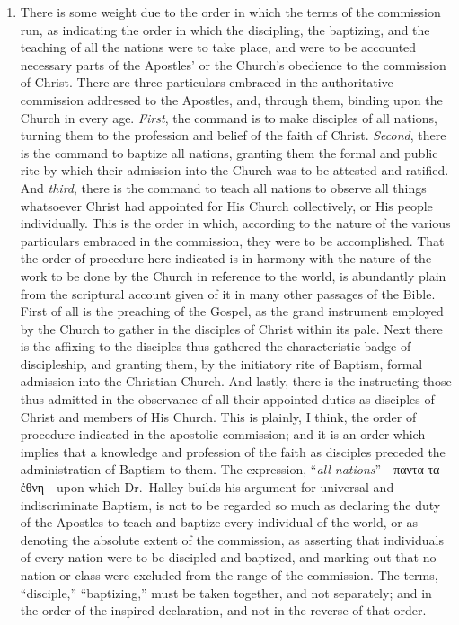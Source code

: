 \documentclass[
]{book}
\begin{document}
\begin{enumerate}
\def\labelenumi{\arabic{enumi}.}
\item
  There is some weight due to the order in which the terms of the commission run, as indicating the order in which the discipling, the baptizing, and the teaching of all the nations were to take place, and were to be accounted necessary parts of the Apostles' or the Church's obedience to the commission of Christ. There are three particulars embraced in the authoritative commission addressed to the Apostles, and, through them, binding upon the Church in every age. \emph{First}, the command is to make disciples of all nations, turning them to the profession and belief of the faith of Christ. \emph{Second}, there is the command to baptize all nations, granting them the formal and public rite by which their admission into the Church was to be attested and ratified. And \emph{third}, there is the command to teach all nations to observe all things whatsoever Christ had appointed for His Church collectively, or His people individually. This is the order in which, according to the nature of the various particulars embraced in the commission, they were to be accomplished. That the order of procedure here indicated is in harmony with the nature of the work to be done by the Church in reference to the world, is abundantly plain from the scriptural account given of it in many other passages of the Bible. First of all is the preaching of the Gospel, as the grand instrument employed by the Church to gather in the disciples of Christ within its pale. Next there is the affixing to the disciples thus gathered the characteristic badge of discipleship, and granting them, by the initiatory rite of Baptism, formal admission into the Christian Church. And lastly, there is the instructing those thus admitted in the observance of all their appointed duties as disciples of Christ and members of His Church. This is plainly, I think, the order of procedure indicated in the apostolic commission; and it is an order which implies that a knowledge and profession of the faith as disciples preceded the administration of Baptism to them. The expression, ``\emph{all nations}''---\foreignlanguage{greek}{παντα τα ἐθνη}---upon which Dr.~Halley builds his argument for universal and indiscriminate Baptism, is not to be regarded so much as declaring the duty of the Apostles to teach and baptize every individual of the world, or as denoting the absolute extent of the commission, as asserting that individuals of every nation were to be discipled and baptized, and marking out that no nation or class were excluded from the range of the commission. The terms, ``disciple,'' ``baptizing,'' must be taken together, and not separately; and in the order of the inspired declaration, and not in the reverse of that order.

\end{enumerate}
\end{document}
